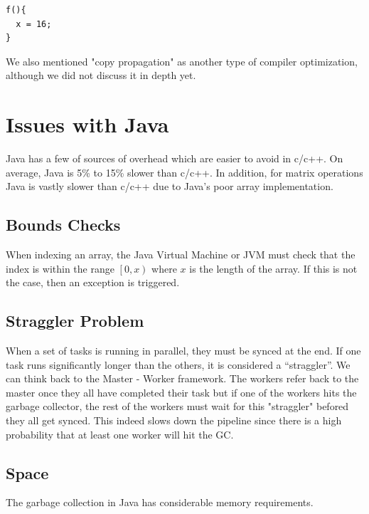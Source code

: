 \documentclass[twoside]{article}
\begin{document}
\begin{verbatim}
f(){
  x = 16;
}
\end{verbatim}

We also mentioned "copy propagation" as another type of compiler optimization, although we did not discuss it in depth yet.

\section{Issues with Java}

Java has a few of sources of overhead which are easier to avoid in c/c++. On average, Java is 5\% to 15\% slower than c/c++. In addition, for matrix operations Java is vastly slower than c/c++ due to Java's poor array implementation.

\subsection{Bounds Checks}

When indexing an array, the Java Virtual Machine or JVM must check that the index is within the range $\left[ 0, x\right)$ where $x$ is the length of the array. If this is not the case, then an exception is triggered. 

\subsection{Straggler Problem}

When a set of tasks is running in parallel, they must be synced at the end. If one task runs significantly longer than the others, it is considered a ``straggler''. We can think back to the Master - Worker framework. The workers refer back to the master once they all have completed their task but if one of the workers hits the garbage collector, the rest of the workers must wait for this "straggler" befored they  all get synced. This indeed slows down the pipeline since there is a high probability that at least one worker will hit the GC. 

\subsection{Space}

The garbage collection in Java has considerable memory requirements. 
\end{document}
